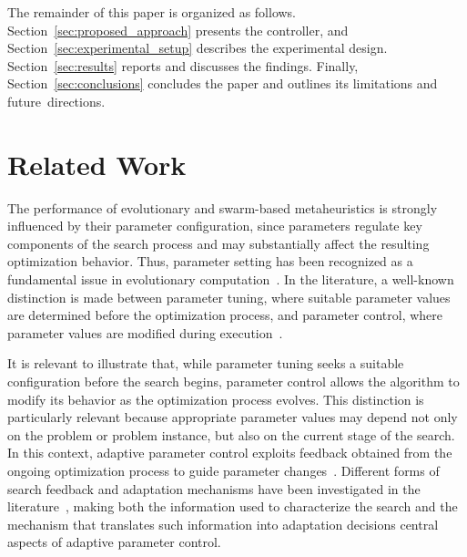 \documentclass[mathematics,article,accept,moreauthors]{Definitions/mdpi}
\begin{document}
The remainder of this paper is organized as follows. Section~\ref{sec:proposed_approach} presents the controller, and Section~\ref{sec:experimental_setup} describes the experimental design. Section~\ref{sec:results} reports and discusses the findings. Finally, Section~\ref{sec:conclusions} concludes the paper and outlines its limitations and \mbox{future directions.}

\section{Related Work}

The performance of evolutionary and swarm-based metaheuristics is strongly influenced by their parameter configuration, since parameters regulate key components of the search process and may substantially affect the resulting optimization behavior. Thus, parameter setting has been recognized as a fundamental issue in evolutionary computation~\cite{eiben-1999,talbi-2009}. In the literature, a well-known distinction is made between parameter tuning, where suitable parameter values are determined before the optimization process, and parameter control, where parameter values are modified during execution~\cite{talbi2021,huang2019survey}.

It is relevant to illustrate that, while parameter tuning seeks a suitable configuration before the search begins, parameter control allows the algorithm to modify its behavior as the optimization process evolves. This distinction is particularly relevant because appropriate parameter values may depend not only on the problem or problem instance, but also on the current stage of the search. In this context, adaptive parameter control exploits feedback obtained from the ongoing optimization process to guide parameter changes~\cite{aleti2016systematic}. Different forms of search feedback and adaptation mechanisms have been investigated in the literature~\cite{de2021,karafotias2014}, making both the information used to characterize the search and the mechanism that translates such information into adaptation decisions central aspects of adaptive parameter control.
\end{document}
